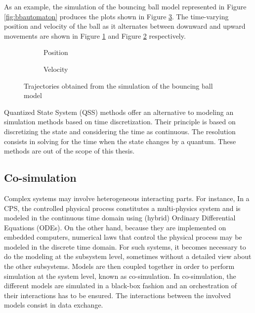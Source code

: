 As an example, the simulation of the bouncing ball model represented in Figure \ref{fig:bbautomaton} produces the plots shown in Figure \ref{fig:bbsim}. The time-varying position and velocity of the ball as it alternates between downward and upward movements are shown in Figure \ref{fig:bbpos} and Figure \ref{fig:bbve} respectively.

\begin{figure}[phtb]
\centering
\begin{subfigure}{\textwidth}
  \centering
  
  \caption{Position}
  \label{fig:bbpos}
\end{subfigure}

\begin{subfigure}{\textwidth}
  \centering
  
  \caption{Velocity}
  \label{fig:bbve}
\end{subfigure}
\caption{Trajectories obtained from the simulation of the bouncing ball model}
\label{fig:bbsim}
\end{figure}

Quantized State System (QSS) methods \cite{kofman:2001} offer an alternative to modeling an simulation methods based on time discretization. Their principle is based on discretizing the state and considering the time as continuous. The resolution consists in solving for the time when the state changes by a quantum. These methods are out of the scope of this thesis. %

\subsection{Co-simulation}

Complex systems may involve heterogeneous interacting parts. For instance, In a CPS, the controlled physical process constitutes a multi-physics system and is modeled in the continuous time domain using (hybrid) Ordinary Differential Equations (ODEs). On the other hand, because they are implemented on embedded computers, numerical laws that control the physical process may be modeled in the discrete time domain. For such systems, it becomes necessary to do the modeling at the subsystem level, sometimes without a detailed view about the other subsystems. Models are then coupled together in order to perform simulation at the system level, known as co-simulation. In co-simulation, the different models are simulated in a black-box fashion and an orchestration of their interactions has to be ensured. The interactions between the involved models consist in data exchange.

